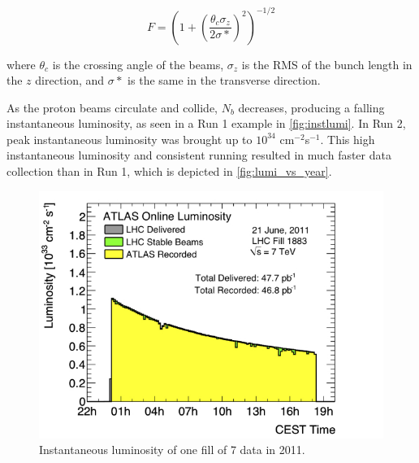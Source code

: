 \begin{equation}
F = (1+ (\frac{\theta_c \sigma_z}{2\sigma*})^2)^{-1/2}
\end{equation}

where $\theta_c$ is the crossing angle of the beams, $\sigma_z$ is the RMS of the bunch length in the $z$ direction, and $\sigma*$ is the same in the transverse direction.

As the proton beams circulate and collide, $N_b$ decreases, producing a falling instantaneous luminosity, as seen in a Run 1 example in \autoref{fig:instlumi}. In Run 2, peak instantaneous luminosity was brought up to $10^{34}$ cm$^{-2}$s$^{-1}$. This high instantaneous luminosity and consistent running resulted in much faster data collection than in Run 1, which is depicted in \autoref{fig:lumi_vs_year}. 

\begin{centering}
\begin{figure}[!hbt]
\myfloatalign
\includegraphics[width=.90\linewidth]{figures/lhc/lumi1883.jpg}
\caption{Instantaneous luminosity of one fill of 7 \tev data in 2011.}
\label{fig:instlumi}
\end{figure}
\end{centering}

